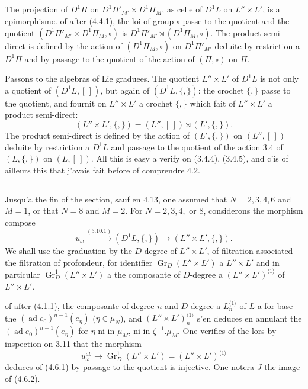 \documentclass[11pt,a4paper]{article}
\theoremstyle{plain}
\theoremstyle{definition}
\DeclareMathOperator{\ad}{ad}
\newcommand{\Gr}{\operatorname{Gr}}
\begin{document}
\subsection{}
The projection of $D^1\Pi$ on $D^1\Pi'_{M'} \times D^1\Pi_M$, as celle of $D^1L$ on $L'' \times L'$, is a epimorphisme. of after (4.4.1), the loi of group $\circ$ passe to the quotient and the quotient $(D^1\Pi'_{M'} \times D^1\Pi_M, \circ)$ is $D^1\Pi'_{M'} \rtimes (D^1\Pi_M, \circ)$. The product semi-direct is defined by the action of $(D^1\Pi_M, \circ)$ on $D^1\Pi'_{M'}$ deduite by restriction a $D^1\Pi$ and by passage to the quotient of the action of $(\Pi, \circ)$ on $\Pi$.

Passons to the algebras of Lie graduees. The quotient $L'' \times L'$ of $D^1L$ is not only a quotient of $(D^1L, [\,])$, but again of $(D^1L, \{,\})$: the crochet $\{,\}$ passe to the quotient, and fournit on $L'' \times L'$ a crochet $\{,\}$ which fait of $L'' \times L'$ a product semi-direct:
\[
(L'' \times L', \{,\}) = (L'', [\,]) \rtimes (L', \{,\}).
\]
The product semi-direct is defined by the action of $(L', \{,\})$ on $(L'', [\,])$ deduite by restriction a $D^1L$ and passage to the quotient of the action 3.4 of $(L, \{,\})$ on $(L, [\,])$. All this is easy a verify on (3.4.4), (3.4.5), and c'is of ailleurs this that j'avais fait before of comprendre 4.2.

\subsection{}
Jusqu'a the fin of the section, sauf en 4.13, one assumed that $N=2,3,4,6$ and $M=1$, or that $N=8$ and $M=2$. For $N=2,3,4,$ or $8$, considerons the morphism compose
\begin{equation}\label{eq:4.6.1}
u_\omega \xrightarrow{(3.10.1)} (D^1L, \{,\}) \to (L'' \times L', \{,\}).
\end{equation}
We shall use the graduation by the $D$-degree of $L'' \times L'$, of filtration associated the filtration of profondeur, for identifier $\Gr_D(L'' \times L')$ a $L'' \times L'$ and in particular $\Gr_D^1(L'' \times L')$ a the composante of $D$-degree a $(L'' \times L')^{\langle 1 \rangle}$ of $L'' \times L'$.

of after (4.1.1), the composante of degree $n$ and $D$-degree a $L^{\langle 1 \rangle}_n$ of $L$ a for base the $(\ad e_0)^{n-1}(e_\eta)$ ($\eta \in \mu_N$), and $(L'' \times L')^{\langle 1 \rangle}_n$ s'en deduces en annulant the $(\ad e_0)^{n-1}(e_\eta)$ for $\eta$ ni in $\mu_M$, ni in $\zeta^{-1}.\mu_M$. One verifies of the lors by inspection on 3.11 that the morphism
\begin{equation}\label{eq:4.6.2}
u_\omega^{ab} \to \Gr_D^1(L'' \times L') = (L'' \times L')^{\langle 1 \rangle}
\end{equation}
deduces of (4.6.1) by passage to the quotient is injective. One notera $J$ the image of (4.6.2).
\end{document}
